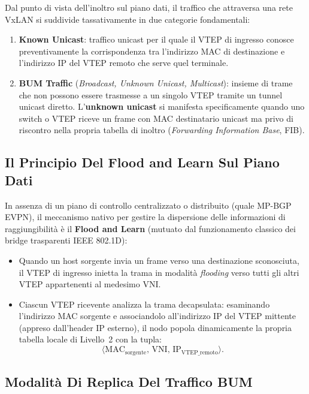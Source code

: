 \documentclass[11pt, a4paper]{article}
\begin{document}
Dal punto di vista dell'inoltro sul piano dati, il traffico che attraversa una rete VxLAN si suddivide tassativamente in due categorie fondamentali:
\begin{enumerate}[noitemsep]
    \item \textbf{Known Unicast}: traffico unicast per il quale il VTEP di ingresso conosce preventivamente la corrispondenza tra l'indirizzo MAC di destinazione e l'indirizzo IP del VTEP remoto che serve quel terminale.
    \item \textbf{BUM Traffic} (\emph{Broadcast, Unknown Unicast, Multicast}): insieme di trame che non possono essere trasmesse a un singolo VTEP tramite un tunnel unicast diretto. L'\textbf{unknown unicast} si manifesta specificamente quando uno switch o VTEP riceve un frame con MAC destinatario unicast ma privo di riscontro nella propria tabella di inoltro (\emph{Forwarding Information Base}, FIB).
\end{enumerate}

\subsection{Il Principio Del Flood and Learn Sul Piano Dati}

In assenza di un piano di controllo centralizzato o distribuito (quale MP-BGP EVPN), il meccanismo nativo per gestire la dispersione delle informazioni di raggiungibilità è il \textbf{Flood and Learn} (mutuato dal funzionamento classico dei bridge trasparenti IEEE 802.1D):
\begin{itemize}[noitemsep]
    \item Quando un host sorgente invia un frame verso una destinazione sconosciuta, il VTEP di ingresso inietta la trama in modalità \emph{flooding} verso tutti gli altri VTEP appartenenti al medesimo VNI.
    \item Ciascun VTEP ricevente analizza la trama decapsulata: esaminando l'indirizzo MAC sorgente e associandolo all'indirizzo IP del VTEP mittente (appreso dall'header IP esterno), il nodo popola dinamicamente la propria tabella locale di Livello~2 con la tupla:
    \[
        \langle \text{MAC}_{\text{sorgente}},\, \text{VNI},\, \text{IP}_{\text{VTEP\_remoto}} \rangle.
    \]
\end{itemize}

\subsection{Modalità Di Replica Del Traffico BUM}
\end{document}

